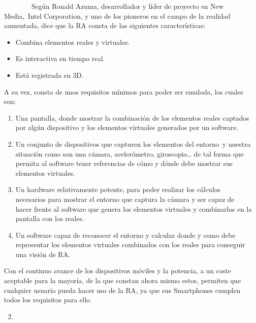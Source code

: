 \documentclass[]{article}
\begin{document}
~~~~~~~~Según Ronald Azuma, desarrollador y líder de proyecto en New
Media,~Intel Corporation, y uno de los pioneros en el campo de la
realidad aumentada, dice que la RA consta de las siguientes
características:

\begin{itemize}
\itemsep1pt\parskip0pt
\item
  Combina elementos reales y virtuales.
\item
  Es interactiva en tiempo real.
\item
  Está registrada en 3D.
\end{itemize}

A su vez, consta de unos requisitos mínimos para poder ser emulada, los
cuales son:

\begin{enumerate}
\itemsep1pt\parskip0pt
\item
  Una pantalla, donde mostrar la combinación de los elementos reales
  captados por algún dispositivo y los elementos virtuales generados por
  un software.
\item
  Un conjunto de dispositivos que capturen los elementos del entorno~y
  nuestra situación como son una cámara, acelerómetro,
  giroscopio\ldots{} de tal forma que permita al software tener
  referencias de cómo y dónde debe mostrar sus elementos virtuales.
\item
  Un hardware relativamente potente, para poder realizar los cálculos
  necesarios para mostrar el entorno que captura la cámara y ser capaz
  de hacer frente al software que genera los elementos virtuales y
  combinarlos en la pantalla con los reales.
\item
  Un software capaz de reconocer el entorno y calcular donde y como debe
  representar los elementos virtuales combinados con los reales para
  conseguir una visión de RA.
\end{enumerate}

Con el continuo avance de los dispositivos móviles y la potencia, a un
coste aceptable para la mayoría, de la que constan ahora mismo estos,
permiten que cualquier usuario pueda hacer uso de la RA, ya que sus
Smartphones cumplen todos los requisitos para ello.

\begin{enumerate}
\setcounter{enumi}{1}
\item
\end{enumerate}
\end{document}
